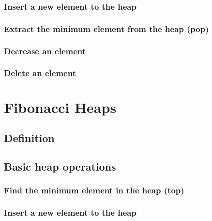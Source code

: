 \documentclass{article}
\begin{document}
\subsubsection{Insert a new element to the heap}

\subsubsection{Extract the minimum element from the heap (pop)}

\subsubsection{Decrease an element}

\subsubsection{Delete an element}

\section{Fibonacci Heaps}
\label{fib-heap}

\subsection{Definition}

\subsection{Basic heap operations}

\subsubsection{Find the minimum element in the heap (top)}

\subsubsection{Insert a new element to the heap}
\end{document}
